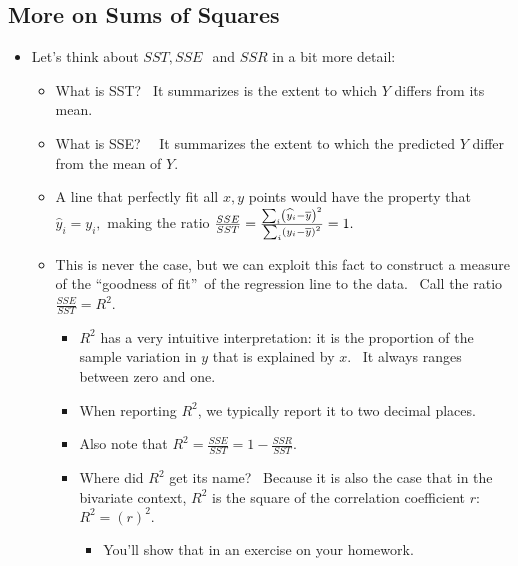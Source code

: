 \documentclass[11pt]{article}
\begin{document}
\subsection{More on Sums of Squares}

\begin{itemize}
\item Let's think about $SST,SSE\ $\ and $SSR$ in a bit more detail: \ 

\begin{itemize}
\item What is SST? \ It summarizes is the extent to which $Y$ differs from
its mean.

\item What is SSE? \ \ It summarizes the extent to which the predicted $Y$
differ from the mean of $Y$.

\item A line that perfectly fit all $x,y$ points would have the property
that $\widehat{y}_{i}=y_{i},$ making the ratio $\frac{SSE}{SST}=\frac{%
\sum\nolimits_{i}\left( \widehat{y}_{i}-\overline{y}\right) ^{2}}{%
\sum\nolimits_{i}\left( y_{i}-\overline{y}\right) ^{2}}=1.$

\item This is never the case, but we can exploit this fact to construct a
measure of the \textquotedblleft goodness of fit\textquotedblright\ of the
regression line to the data. \ Call the ratio $\frac{SSE}{SST}=R^{2}.$ \ 

\begin{itemize}
\item $R^{2}$ has a very intuitive interpretation: it is the proportion of
the sample variation in $y$ that is explained by $x$. \ It always ranges
between zero and one.

\item When reporting $R^{2}$, we typically report it to two decimal places.

\item Also note that $R^{2}=\frac{SSE}{SST}=1-\frac{SSR}{SST}.$

\item Where did $R^{2}$ get its name? \ Because it is also the case that in
the bivariate context, $R^{2}$ is the square of the correlation coefficient $%
r$: $R^{2}=\left( r\right) ^{2}.$

\begin{itemize}
\item You'll show that in an exercise on your homework.
\end{itemize}
\end{itemize}
\end{itemize}
\end{itemize}
\end{document}
